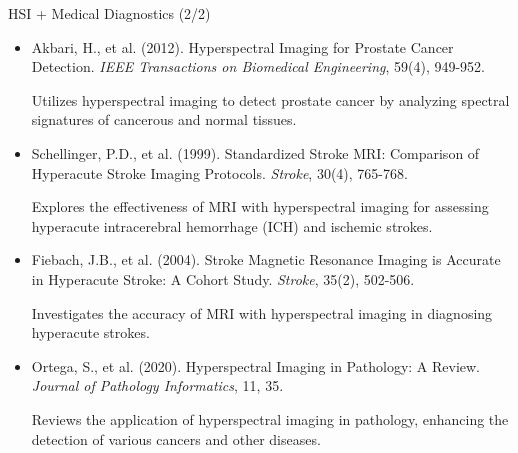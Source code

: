 \documentclass[10pt,svgnames,fragile]{beamer}
\begin{document}
\begin{frame}{HSI + Medical Diagnostics (2/2)}
\footnotesize
\begin{itemize}
    \item Akbari, H., et al. (2012). Hyperspectral Imaging for Prostate Cancer Detection. \textit{IEEE Transactions on Biomedical Engineering}, 59(4), 949-952. \href{https://consensus.app/papers/hyperspectral-imaging-analysis-prostate-cancer-akbari/867fee31d50759d8a8ebe58fcc5cd750/?utm_source=chatgpt}{\color{blue}{DOI: 10.1109/TBME.2012.2189882}}

    {\color{gray}Utilizes hyperspectral imaging to detect prostate cancer by analyzing spectral signatures of cancerous and normal tissues.}

    \item Schellinger, P.D., et al. (1999). Standardized Stroke MRI: Comparison of Hyperacute Stroke Imaging Protocols. \textit{Stroke}, 30(4), 765-768. \href{https://consensus.app/papers/standardized-stroke-comparison-hemorrhage-schellinger/8fbc8c749c435c8e94e7af9de90a78aa/?utm_source=chatgpt}{\color{blue}{DOI: 10.1161/01.STR.30.4.765}}

    {\color{gray}Explores the effectiveness of MRI with hyperspectral imaging for assessing hyperacute intracerebral hemorrhage (ICH) and ischemic strokes.}

    \item Fiebach, J.B., et al. (2004). Stroke Magnetic Resonance Imaging is Accurate in Hyperacute Stroke: A Cohort Study. \textit{Stroke}, 35(2), 502-506. \href{https://consensus.app/papers/stroke-magnetic-resonance-imaging-accurate-hyperacute-fiebach/f5f34a7ddc415e8b88f3c4b51ee76d5c/?utm_source=chatgpt}{\color{blue}{DOI: 10.1161/01.STR.0000114871.19735.23}}

    {\color{gray}Investigates the accuracy of MRI with hyperspectral imaging in diagnosing hyperacute strokes.}

    \item Ortega, S., et al. (2020). Hyperspectral Imaging in Pathology: A Review. \textit{Journal of Pathology Informatics}, 11, 35. \href{https://consensus.app/papers/imaging-pathology-review-invited-ortega/da0cdf35f01d556d80c0c17d41bacee3/?utm_source=chatgpt}{\color{blue}{DOI: 10.4103/jpi.jpi\_16\_20}}

    {\color{gray}Reviews the application of hyperspectral imaging in pathology, enhancing the detection of various cancers and other diseases.}
\end{itemize}
\end{frame}
\end{document}
